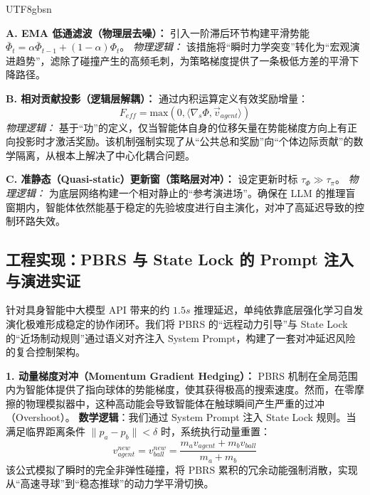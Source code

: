 \documentclass[11pt,a4paper]{article}
\begin{document}
\begin{CJK*}{UTF8}{gbsn}
\begin{tcolorbox}[enhanced, colback=blue!5!white, colframe=SDUBlue, arc=2mm, title=\textbf{解耦机制的物理与数学逻辑}]
\textbf{A. EMA 低通滤波（物理层去噪）：} 引入一阶滞后环节构建平滑势能 $\bar{\Phi}_t = \alpha \bar{\Phi}_{t-1} + (1-\alpha) \Phi_t$。
\textit{物理逻辑：} 该措施将“瞬时力学突变”转化为“宏观演进趋势”，滤除了碰撞产生的高频毛刺，为策略梯度提供了一条极低方差的平滑下降路径。

\textbf{B. 相对贡献投影（逻辑层解耦）：} 通过内积运算定义有效奖励增量：
\begin{equation}
F_{eff} = \text{max}(0, \langle \nabla_s \Phi, \vec{v}_{agent} \rangle)
\end{equation}
\textit{物理逻辑：} 基于“功”的定义，仅当智能体自身的位移矢量在势能梯度方向上有正向投影时才激活奖励。该机制强制实现了从“公共总和奖励”向“个体边际贡献”的数学隔离，从根本上解决了中心化耦合问题。

\textbf{C. 准静态（Quasi-static）更新窗（策略层对冲）：} 设定更新时标 $\tau_{\Phi} \gg \tau_{\pi}$。
\textit{物理逻辑：} 为底层网络构建一个相对静止的“参考演进场”。确保在 LLM 的推理盲窗期内，智能体依然能基于稳定的先验坡度进行自主演化，对冲了高延迟导致的控制环路失效。
\end{tcolorbox}

\subsection{工程实现：PBRS 与 State Lock 的 Prompt 注入与演进实证}

针对具身智能中大模型 API 带来的约 $1.5s$ 推理延迟，单纯依靠底层强化学习自发演化极难形成稳定的协作闭环。我们将 PBRS 的“远程动力引导”与 State Lock 的“近场制动规则”通过语义对齐注入 System Prompt，构建了一套对冲延迟风险的复合控制架构。

\begin{tcolorbox}[enhanced, colback=blue!5!white, colframe=SDUBlue, arc=2mm, title=\textbf{PBRS 与 State Lock 的协同逻辑与延迟补偿}]
\textbf{1. 动量梯度对冲（Momentum Gradient Hedging）：}
PBRS 机制在全局范围内为智能体提供了指向球体的势能梯度，使其获得极高的搜索速度。然而，在零摩擦的物理模拟器中，这种高动能会导致智能体在触球瞬间产生严重的过冲（Overshoot）。
\textbf{数学逻辑}：我们通过 System Prompt 注入 State Lock 规则。当满足临界距离条件 $\|p_a - p_b\| < \delta$ 时，系统执行动量重置：
\begin{equation}
v_{agent}^{new} = v_{ball}^{new} = \frac{m_a v_{agent} + m_b v_{ball}}{m_a + m_b}
\end{equation}
该公式模拟了瞬时的完全非弹性碰撞，将 PBRS 累积的冗余动能强制消散，实现从“高速寻球”到“稳态推球”的动力学平滑切换。


\end{tcolorbox}
\end{CJK*}
\end{document}
